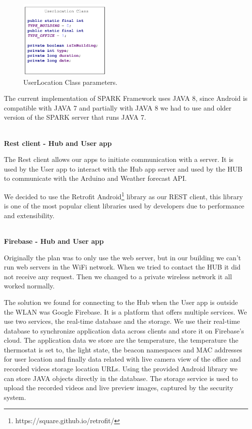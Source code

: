 \begin{figure}[h]
\centering
\includegraphics[width=0.4\textwidth]{Figures/userlocation_class}
\caption{UserLocation Class parameters.}
\label{user_location_class}
\end{figure}

The current implementation of SPARK Framework uses JAVA 8, since Android is compatible with JAVA 7 and partially with JAVA 8 we had to use and older version of the SPARK server that runs JAVA 7.  

\mbox{}\\
\textbf{Rest client - Hub and User app }

The Rest client allows our apps to initiate communication with a server. It is used by the User app to interact with the Hub app server and used by the HUB to communicate with the Arduino and Weather forecast API.

We decided to use the Retrofit Android\footnote{https://square.github.io/retrofit/}  library as our \ac{REST} client, this library is one of the most popular client libraries used by developers due to performance and extensibility.



\mbox{}\\
\textbf{Firebase - Hub and User app}

Originally the plan was to only use the web server, but in our building we can't run web servers in the WiFi network. When we tried to contact the HUB it did not receive any request. Then we changed to a private wireless network it all worked normally.

The solution we found for connecting  to the Hub when the User app is outside the \ac{WLAN} was Google Firebase. It is a platform that offers multiple services. We use two services, the real-time database and the storage.
We use their real-time database to synchronize application data across clients and store it on Firebase's cloud. The application data we store are the temperature, the temperature the thermostat is set to, the light state, the beacon namespaces and MAC addresses for user location and finally data related with live camera view of the office and recorded videos storage location URLs. Using the provided Android library we can store JAVA objects directly in the database. The storage service is used to upload the recorded videos and live preview images, captured by the security system.


